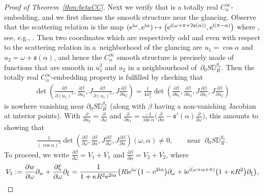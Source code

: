 \documentclass[pdftex]{sigma}
\numberwithin{equation}{section}
\theoremstyle{definition}
\newcommand{\1}{{\bf 1}}
\newcommand \Dm { \mathbb{D}}
\renewcommand \ss {\mathfrak s}
\begin{document}
\begin{proof}[Proof of Theorem~\ref{thm:betaCC}]
Next we verify that \smash{$\beta|_{ {\partial_+ S\Dm_R^{g_\kappa}}}$} is a totally real $C_\alpha^\infty$-embedding, and we first discuss the smooth structure near the glancing. Observe that the scattering relation is the map $({\rm e}^{{\rm i}\omega},{\rm e}^{{\rm i}\alpha})\mapsto \bigl({\rm e}^{{\rm i}(\omega+\pi+2\ss(\alpha))}, {\rm e}^{{\rm i}(\pi-\alpha)}\bigr)$ where \smash{$\ss(\alpha) := \tan^{-1} \bigl( \frac{1-\kappa R^2}{1+\kappa R^2} \tan\alpha\bigr)$}, see, e.g., \cite[Section~4.1]{Monard2020}. Then two coordinates which are respectively odd and even with respect to the scattering relation in a~neighborhood of the glancing are $u_1 = \cos\alpha$ and $u_2 = \omega + \ss(\alpha)$, and hence the $C_\alpha^\infty$ smooth structure is precisely made of functions that are smooth in $u_1^2$ and $u_2$ in a neighbourhood of~$\partial_0 S\Dm_R^{g_\kappa}$. Then the totally real $C_\alpha^\infty$-embedding property is fulfilled by checking that
	\begin{align*}
		\det \left(\frac{\partial\beta}{\partial (u_1)^2}, \frac{\partial\beta}{\partial u_2}, J \frac{\partial\beta}{\partial (u_1)^2}, J\frac{\partial\beta}{\partial u_2}\right) = \frac{1}{4 u_1^2}\det \left(\frac{\partial\beta}{\partial u_1}, \frac{\partial\beta}{\partial u_2}, J \frac{\partial\beta}{\partial u_1}, J \frac{\partial\beta}{\partial u_2}\right)
	\end{align*}
	is nowhere vanishing near $\partial_0 S\Dm_R^{g_\kappa}$ (along with $\beta$ having a non-vanishing Jacobian at interior points). With $\frac{\partial}{\partial u_2} = \frac{\partial}{\partial \omega}$ and $\frac{\partial}{\partial u_1} = \frac{-1}{\sin\alpha} \bigl(\frac{\partial}{\partial\alpha} - \ss'(\alpha) \frac{\partial}{\partial\omega}\bigr)$, this amounts to showing that
	\begin{align*}
		\frac{1}{(\cos\alpha)^2}\det \left(\frac{\partial\beta}{\partial\omega}, \frac{\partial\beta}{\partial\alpha}, J \frac{\partial\beta}{\partial\omega}, J\frac{\partial\beta}{\partial\alpha}\right) (\omega,\alpha) \ne 0, \qquad \text{near }\ \partial_0 S\Dm_R^{g_\kappa}.
	\end{align*}
	To proceed, we write $\frac{\partial\beta}{\partial\omega} = V_1 + \overline{V_1}$ and $\frac{\partial\beta}{\partial\alpha} = V_2 + \overline{V_2}$, where
	\begin{align*}
		&V_1:= \frac{\partial w}{\partial\omega}\partial_w + \frac{\partial\xi}{\partial\omega} \partial_\xi = \frac{1}{1+\kappa R^2 {\rm e}^{2{\rm i}\alpha}} \bigl( R{\rm i} {\rm e}^{{\rm i}\omega} \bigl(1-{\rm e}^{2{\rm i}\alpha}\bigr) \partial_\omega + {\rm i} {\rm e}^{{\rm i}(\omega+\alpha+\pi)} \bigl(1+\kappa R^2\bigr) \partial_\xi\bigr), \\

\end{align*}
\end{proof}
\end{document}
